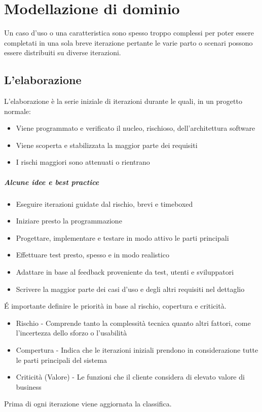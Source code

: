 \chapter{Modellazione di dominio}
Un caso d'uso o una caratteristica sono spesso troppo
complessi per poter essere completati in una sola breve iterazione
pertante le varie parto o scenari possono essere distribuiti su diverse iterazioni.

\section{L'elaborazione}
L'elaborazione è la serie iniziale di iterazioni durante le quali, in un progetto
normale:
\begin{itemize}
    \item Viene programmato e verificato il nucleo, rischioso, dell'architettura software
    \item Viene scoperta e stabilizzata la maggior parte dei requisiti
    \item I rischi maggiori sono attenuati o rientrano
\end{itemize}
\paragraph*{Alcune idee e best practice}
\begin{itemize}
    \item Eseguire iterazioni guidate dal rischio, brevi e timeboxed
    \item Iniziare presto la programmazione
    \item Progettare, implementare e testare in modo attivo le parti principali
    \item Effettuare test presto, spesso e in modo realistico
    \item Adattare in base al feedback proveniente da test, utenti e sviluppatori
    \item Scrivere la maggior parte dei casi d'uso e degli altri requisiti nel dettaglio
\end{itemize}
\'E importante definire le priorità in base al rischio, copertura e criticità.
\begin{itemize}
    \item Rischio - Comprende tanto la complessità tecnica quanto altri fattori,
    come l'incertezza dello sforzo o l'usabilità
    \item Compertura - Indica che le iterazioni iniziali prendono in considerazione tutte
    le parti principali del sistema
    \item Criticità (Valore) - Le funzioni che il cliente considera di elevato
    valore di business
\end{itemize}
Prima di ogni iterazione viene aggiornata la classifica.
